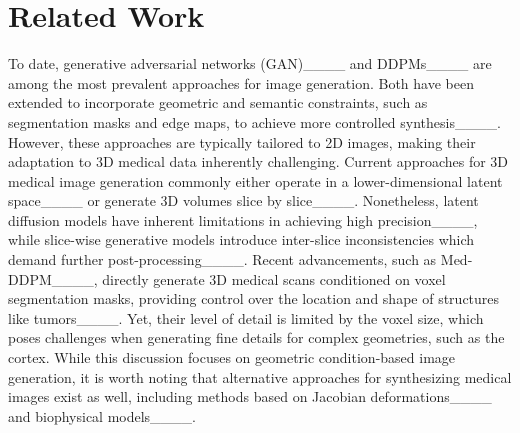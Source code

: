 \section{Related Work}
To date, generative adversarial networks (GAN)____ and 
DDPMs____ are among the most prevalent approaches for image generation. 
Both have been extended to incorporate geometric and semantic constraints, such as segmentation masks and edge maps, to achieve more controlled  synthesis____. 
However, these approaches are typically tailored to 2D images, making their adaptation to 3D medical data inherently challenging. 
Current approaches for 3D medical image generation commonly either
operate in a lower-dimensional latent space____ or generate 3D volumes slice by slice____. Nonetheless, 
latent diffusion models have inherent limitations in achieving high precision____, while slice-wise generative models introduce inter-slice inconsistencies which demand further post-processing____.
Recent advancements, such as Med-DDPM____, directly generate 3D medical scans conditioned on voxel segmentation masks, providing control over the location and shape of structures like tumors____. 
Yet, their level of detail is limited by the voxel size, 
which poses challenges when generating fine details for complex geometries, such as the cortex.
While this discussion focuses on geometric condition-based image generation, it is worth noting that alternative approaches for synthesizing medical images exist as well, including methods based on Jacobian deformations____ and biophysical models____.



